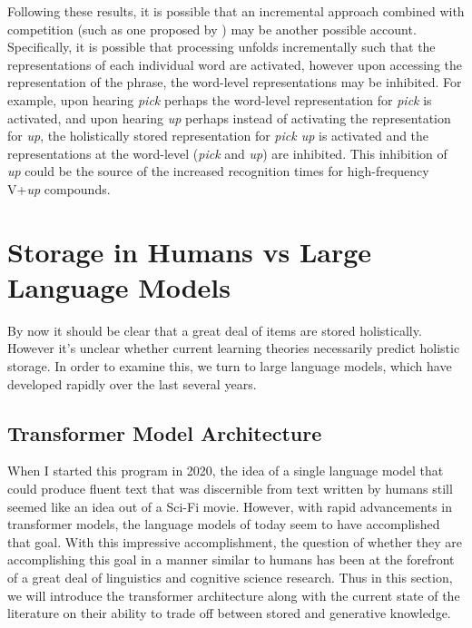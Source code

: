 \documentclass[
  12pt,
  letterpaper,
]{scrreport}
\begin{document}
Following these results, it is possible that an incremental approach
combined with competition (such as one proposed by
)
may be another possible account. Specifically, it is possible that
processing unfolds incrementally such that the representations of each
individual word are activated, however upon accessing the representation
of the phrase, the word-level representations may be inhibited. For
example, upon hearing \emph{pick} perhaps the word-level representation
for \emph{pick} is activated, and upon hearing \emph{up} perhaps instead
of activating the representation for \emph{up}, the holistically stored
representation for \emph{pick up} is activated and the representations
at the word-level (\emph{pick} and \emph{up}) are inhibited. This
inhibition of \emph{up} could be the source of the increased recognition
times for high-frequency V+\emph{up} compounds.

\section{Storage in Humans vs Large Language
Models}\label{sec-storage-in-humans-vs-large-language-models}

By now it should be clear that a great deal of items are stored
holistically. However it's unclear whether current learning theories
necessarily predict holistic storage. In order to examine this, we turn
to large language models, which have developed rapidly over the last
several years.

\subsection{Transformer Model
Architecture}\label{transformer-model-architecture}

When I started this program in 2020, the idea of a single language model
that could produce fluent text that was discernible from text written by
humans still seemed like an idea out of a Sci-Fi movie. However, with
rapid advancements in transformer models, the language models of today
seem to have accomplished that goal. With this impressive
accomplishment, the question of whether they are accomplishing this goal
in a manner similar to humans has been at the forefront of a great deal
of linguistics and cognitive science research. Thus in this section, we
will introduce the transformer architecture along with the current state
of the literature on their ability to trade off between stored and
generative knowledge.
\end{document}
